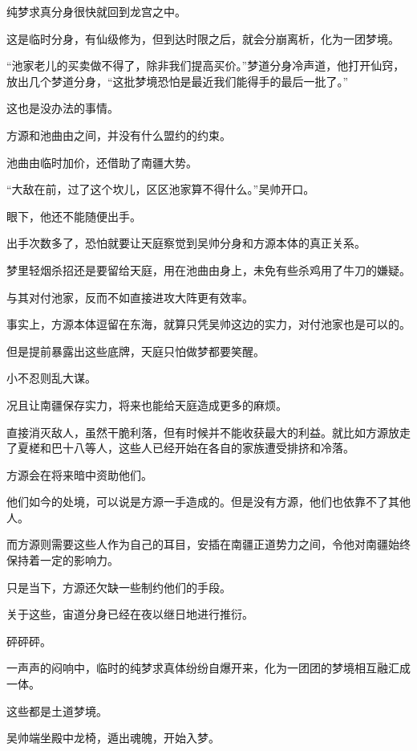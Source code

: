 \begin{this_body}
纯梦求真分身很快就回到龙宫之中。

这是临时分身，有仙级修为，但到达时限之后，就会分崩离析，化为一团梦境。

“池家老儿的买卖做不得了，除非我们提高买价。”梦道分身冷声道，他打开仙窍，放出几个梦道分身，“这批梦境恐怕是最近我们能得手的最后一批了。”

这也是没办法的事情。

方源和池曲由之间，并没有什么盟约的约束。

池曲由临时加价，还借助了南疆大势。

“大敌在前，过了这个坎儿，区区池家算不得什么。”吴帅开口。

眼下，他还不能随便出手。

出手次数多了，恐怕就要让天庭察觉到吴帅分身和方源本体的真正关系。

梦里轻烟杀招还是要留给天庭，用在池曲由身上，未免有些杀鸡用了牛刀的嫌疑。

与其对付池家，反而不如直接进攻大阵更有效率。

事实上，方源本体逗留在东海，就算只凭吴帅这边的实力，对付池家也是可以的。

但是提前暴露出这些底牌，天庭只怕做梦都要笑醒。

小不忍则乱大谋。

况且让南疆保存实力，将来也能给天庭造成更多的麻烦。

直接消灭敌人，虽然干脆利落，但有时候并不能收获最大的利益。就比如方源放走了夏槎和巴十八等人，这些人已经开始在各自的家族遭受排挤和冷落。

方源会在将来暗中资助他们。

他们如今的处境，可以说是方源一手造成的。但是没有方源，他们也依靠不了其他人。

而方源则需要这些人作为自己的耳目，安插在南疆正道势力之间，令他对南疆始终保持着一定的影响力。

只是当下，方源还欠缺一些制约他们的手段。

关于这些，宙道分身已经在夜以继日地进行推衍。

砰砰砰。

一声声的闷响中，临时的纯梦求真体纷纷自爆开来，化为一团团的梦境相互融汇成一体。

这些都是土道梦境。

吴帅端坐殿中龙椅，遁出魂魄，开始入梦。

\end{this_body}

